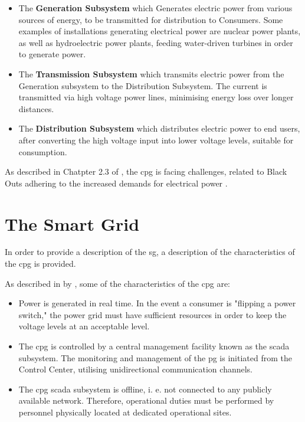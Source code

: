 \begin{itemize}

 \item The \textbf{Generation Subsystem} which Generates electric power from various sources of energy, to be transmitted for distribution to Consumers. Some examples of installations generating electrical power are nuclear power plants, as well as hydroelectric power plants, feeding water-driven turbines in order to generate power.
 \item The \textbf{Transmission Subsystem} which transmits electric power from the Generation subsystem to the Distribution Subsystem. The current is transmitted via high voltage power lines, minimising energy loss over longer distances.
 \item The \textbf{Distribution Subsystem} which distributes electric power to end users, after converting the high voltage input into lower voltage levels, suitable for consumption.
 \end{itemize}

As described in Chatpter 2.3 of \cite{Rihan2018} %
, the \acrlong{cpg} is facing challenges, related to Black Outs adhering to the increased demands for electrical power . 


\section{The Smart Grid}




In order to provide a description of the \acrfull{sg}, a description of the characteristics of the \acrshort{cpg} is provided.





As described in  \cite{BlumeStevenW2007Epsb} by \citeauthor{BlumeStevenW2007Epsb}, some of the characteristics of the \acrlong{cpg} are:

\begin{itemize}
\item Power is generated in real time. In the event a consumer is "flipping a power switch," the power grid must have sufficient resources in order to keep the voltage levels at an acceptable level.
\item The \acrlong{cpg} is controlled by a central management facility known as the \acrfull{scada} subsystem. The monitoring and management of the \acrshort{pg} is initiated from the Control Center, utilising unidirectional communication channels. 
\item The \acrlong{cpg} \acrlong{scada} subsystem is offline, i. e. not connected to any publicly available network. Therefore, operational duties must be performed by personnel physically located at dedicated operational sites.

\end{itemize}

